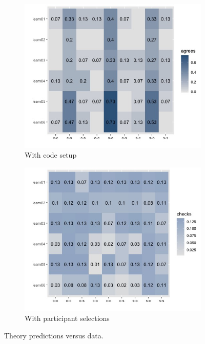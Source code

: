 \documentclass{article}
\begin{document}
\begin{figure}[h!]
  \centering
  \begin{subfigure}[t]{0.45\textwidth}
    \centering
    \includegraphics[width=\linewidth]{th_norm} 
    \caption{With code setup}
  \end{subfigure}
  \hfill
  \begin{subfigure}[t]{0.45\textwidth}
    \centering
    \includegraphics[width=\linewidth]{th_ppt} 
    \caption{With participant selections}
  \end{subfigure}
  \caption{Theory predictions versus data.}
  \label{fig:theory_comp}
\end{figure}
\end{document}
